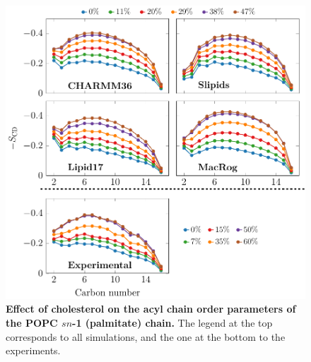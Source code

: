 \documentclass[journal=jpcbfk]{achemso}
\begin{document}
\begin{figure}[htb!]
    \centering
    \includegraphics[width=\linewidth]{../FIGS/palmitate.pdf}
    \caption{\label{SIfig:palmitate}%
     \textbf{Effect of cholesterol on the acyl chain order parameters of the POPC $sn$-1 (palmitate) chain.}
     The legend at the top corresponds to all simulations, and the one at the bottom to the experiments.
    }
\end{figure}
\end{document}
